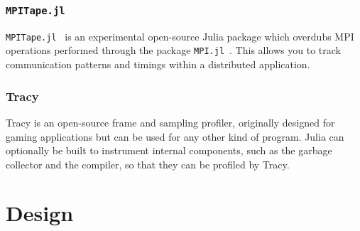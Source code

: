 \documentclass{juliacon}
\newcommand{\jlpkg}[1]{\texttt{#1}}
\newcommand*\vtext{\rotatebox{90}}
\begin{document}
\subsubsection*{\texttt{MPITape.jl}}
\label{sec:mpitape-jl}

\texttt{MPITape.jl}~\cite{mpitapejl} is an experimental open-source Julia package which overdubs MPI operations performed through the package \jlpkg{MPI.jl}~\cite{byrne2021mpi}.
This allows you to track communication patterns and timings within a distributed application.

\subsubsection*{Tracy}
\label{sec:tracy}

Tracy is an open-source frame and sampling profiler, originally designed for gaming applications but can be used for any other kind of program.
Julia can optionally be built to instrument internal components, such as the garbage collector and the compiler, so that they can be profiled by Tracy.


\section{Design}\label{sec:design}
\end{document}
